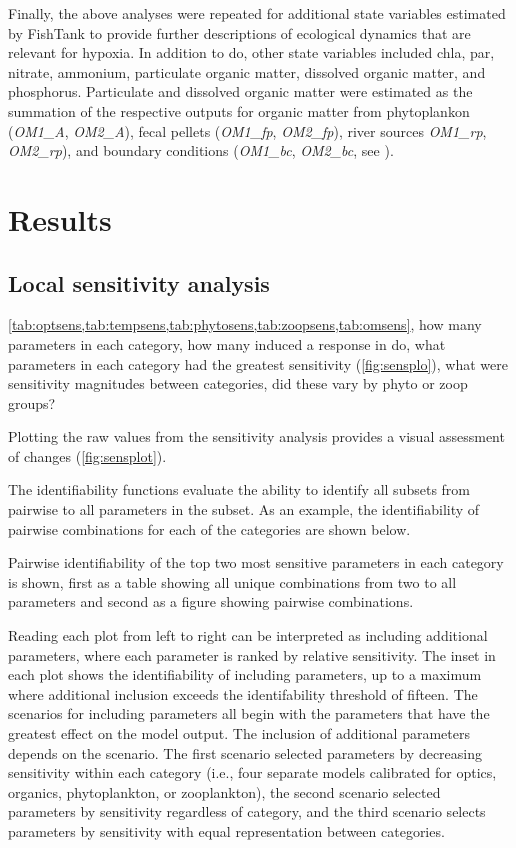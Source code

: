 \documentclass[letterpaper,12pt,oneside]{article}\usepackage[]{graphicx}\usepackage[]{color}
\begin{document}
Finally, the above analyses were repeated for additional state variables estimated by FishTank to provide further descriptions of ecological dynamics that are relevant for hypoxia.  In addition to \ac{do}, other state variables included \ac{chla}, \ac{par}, nitrate, ammonium, particulate organic matter, dissolved organic matter, and phosphorus.  Particulate and dissolved organic matter were estimated as the summation of the respective outputs for organic matter from phytoplankon (\textit{OM1\_A}, \textit{OM2\_A}), fecal pellets (\textit{OM1\_fp}, \textit{OM2\_fp}), river sources \textit{OM1\_rp}, \textit{OM2\_rp}), and boundary conditions (\textit{OM1\_bc}, \textit{OM2\_bc}, see ). 

\section{Results}

\subsection{Local sensitivity analysis}

\cref{tab:optsens,tab:tempsens,tab:phytosens,tab:zoopsens,tab:omsens}, how many parameters in each category, how many induced a response in \ac{do}, what parameters in each category had the greatest sensitivity (\cref{fig:sensplo}), what were sensitivity magnitudes between categories, did these vary by phyto or zoop groups?  

Plotting the raw values from the sensitivity analysis provides a visual assessment of changes (\cref{fig:sensplot}).

The identifiability functions evaluate the ability to identify all subsets from pairwise to all parameters in the subset.  As an example, the identifiability of pairwise combinations for each of the categories are shown below.

Pairwise identifiability of the top two most sensitive parameters in each category is shown, first as a table showing all unique combinations from two to all parameters and second as a figure showing pairwise combinations.

Reading each plot from left to right can be interpreted as including additional parameters, where each parameter is ranked by relative sensitivity.  The inset in each plot shows the identifiability of including parameters, up to a maximum where additional inclusion exceeds the identifability threshold of fifteen.  The scenarios for including parameters all begin with the parameters that have the greatest effect on the model output.  The inclusion of additional parameters depends on the scenario.  The first scenario selected parameters by decreasing sensitivity within each category (i.e., four separate models calibrated for optics, organics, phytoplankton, or zooplankton), the second scenario selected parameters by sensitivity regardless of category, and the third scenario selects parameters by sensitivity with equal representation between categories. 
\end{document}
